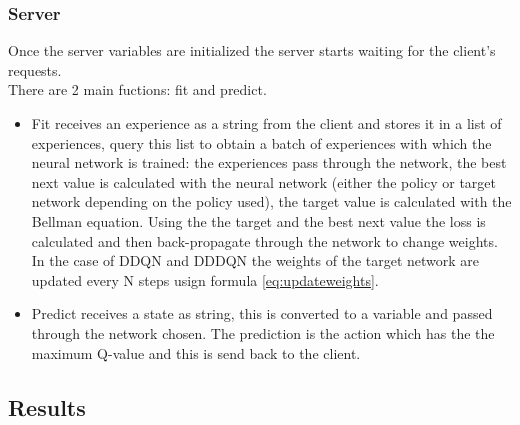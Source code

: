 \documentclass[14pt]{extarticle}
\def\sp{\vspace{5pt}}
\begin{document}
\begin{flushleft}
\subsubsection{Server}
Once the server variables are initialized the server starts waiting for the client's requests. \\
There are 2 main fuctions: fit and predict.
\begin{itemize}
\item Fit receives an experience as a string from the client and stores it in a list of experiences, query this list to obtain a batch of experiences with which the neural network is trained: the experiences pass through the network, the best next value is calculated with the neural network (either the policy or target network depending on the policy used), the target value is calculated with the Bellman equation. Using the the target and the best next value the loss is calculated and then back-propagate through the network to change weights. \\
In the case of DDQN and DDDQN the weights of the target network are updated every N steps usign formula \ref{eq:updateweights}.
\item Predict receives a state as string, this is converted to a variable and passed through the network chosen. The prediction is the action which has the the maximum Q-value and this is send back to the client.
\end{itemize}

\end{flushleft}

\newpage
\begin{center}
	\section{Results}
	\sp
\end{center}
\end{document}
